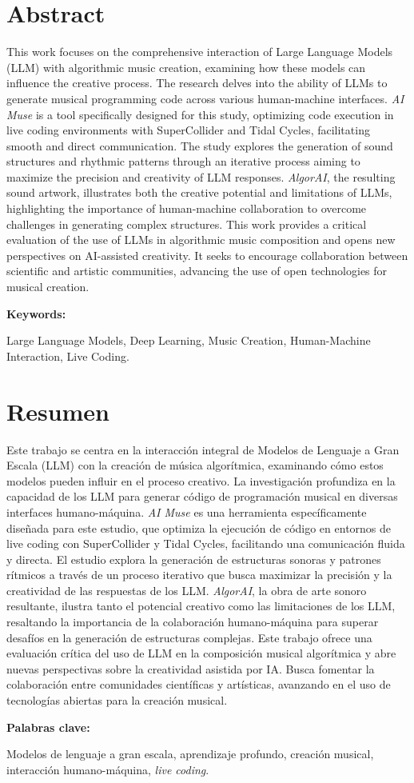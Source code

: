   \clearpage
  \chapter*{Abstract}

  This work focuses on the comprehensive interaction of Large Language Models (LLM) with algorithmic music creation, examining how these models can influence the creative process. The research delves into the ability of LLMs to generate musical programming code across various human-machine interfaces. \emph{AI Muse} is a tool specifically designed for this study, optimizing code execution in live coding environments with SuperCollider and Tidal Cycles, facilitating smooth and direct communication. The study explores the generation of sound structures and rhythmic patterns through an iterative process aiming to maximize the precision and creativity of LLM responses. \emph{AlgorAI}, the resulting sound artwork, illustrates both the creative potential and limitations of LLMs, highlighting the importance of human-machine collaboration to overcome challenges in generating complex structures. This work provides a critical evaluation of the use of LLMs in algorithmic music composition and opens new perspectives on AI-assisted creativity. It seeks to encourage collaboration between scientific and artistic communities, advancing the use of open technologies for musical creation.

  \vspace{1cm}
  \textbf{Keywords:} %
  
  Large Language Models, Deep Learning, Music Creation, Human-Machine Interaction, Live Coding.


  \clearpage
  \chapter*{Resumen}

  Este trabajo se centra en la interacción integral de Modelos de Lenguaje a Gran Escala (LLM) con la creación de música algorítmica, examinando cómo estos modelos pueden influir en el proceso creativo. La investigación profundiza en la capacidad de los LLM para generar código de programación musical en diversas interfaces humano-máquina. \emph{AI Muse} es una herramienta específicamente diseñada para este estudio, que optimiza la ejecución de código en entornos de live coding con SuperCollider y Tidal Cycles, facilitando una comunicación fluida y directa. El estudio explora la generación de estructuras sonoras y patrones rítmicos a través de un proceso iterativo que busca maximizar la precisión y la creatividad de las respuestas de los LLM. \emph{AlgorAI}, la obra de arte sonoro resultante, ilustra tanto el potencial creativo como las limitaciones de los LLM, resaltando la importancia de la colaboración humano-máquina para superar desafíos en la generación de estructuras complejas. Este trabajo ofrece una evaluación crítica del uso de LLM en la composición musical algorítmica y abre nuevas perspectivas sobre la creatividad asistida por IA. Busca fomentar la colaboración entre comunidades científicas y artísticas, avanzando en el uso de tecnologías abiertas para la creación musical.

  \vspace{1cm}
  \textbf{Palabras clave:} %

  Modelos de lenguaje a gran escala, aprendizaje profundo, creación musical, interacción humano-máquina, \emph{live coding}.
  